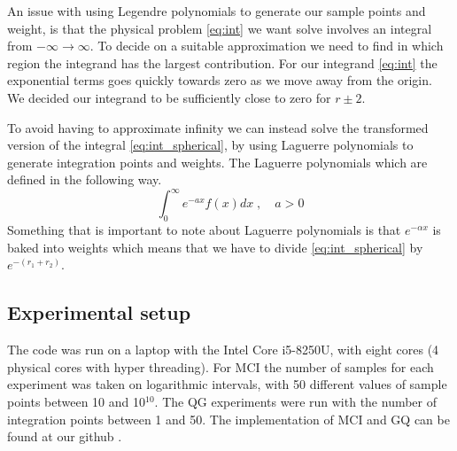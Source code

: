 An issue with using Legendre polynomials to generate our sample points and
weight, is that the physical problem \cref{eq:int} we want solve involves an
integral from $-\infty \to \infty$. To decide on a suitable approximation we
need to find in which region the integrand has the largest contribution. For our
integrand \cref{eq:int} the exponential terms goes quickly towards zero as we
move away from the origin. We decided our integrand to be sufficiently close to
zero for $r \pm 2 $.

To avoid having to approximate infinity we can instead solve the
transformed version of the integral \cref{eq:int_spherical}, by using Laguerre
polynomials to generate integration points and weights. The Laguerre polynomials
which are defined in the following way.
\begin{equation}\label{eq:laguerre}
  \int_0^{\infty} e^{-a x} f(x)dx \; , \quad a > 0 
\end{equation}
Something that is important to note about Laguerre polynomials is that
$e^{-\alpha x}$ is baked into weights which means that we have to divide
\cref{eq:int_spherical} by $e^{-(r_1 + r_2)}$.



\subsection{Experimental setup}

The code was run on a laptop with the Intel Core i5-8250U, with eight cores
(4 physical cores with hyper threading). For MCI
the number of samples for each experiment was taken on logarithmic intervals,
with 50 different values of sample points between 10 and 10$^{10}$. The QG
experiments were run with the number of integration points between 1 and 50.
The implementation of MCI and GQ can be found at our github \parencite{github}.
